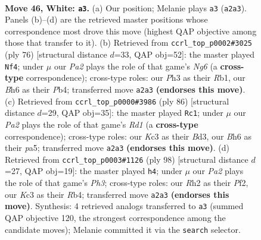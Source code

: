 \documentclass[11pt]{article}
\begin{document}
\clearpage

\begin{figure}[p]\centering
\begin{subfigure}{0.46\textwidth}\centering
\resizebox{\linewidth}{!}{%
\newchessgame
\chessboard[
  setfen={6k1/5p2/5n1B/8/p3p2p/2Kp3P/PP3P1R/1r6 w - - 2 46},
  showmover=false,
  pgfstyle=straightmove, color=movearrow, markmove={a2-a3}
]}
\caption{}
\end{subfigure}\hfill
\begin{subfigure}{0.46\textwidth}\centering
\resizebox{\linewidth}{!}{%
\newchessgame
\chessboard[
  setfen={3k4/3n4/1p1P1pNp/3r4/PP4p1/5pK1/5P2/1R6 w - - 2 39},
  showmover=false,
  pgfstyle=straightmove, color=movearrow, markmove={g6-f4}
]}
\caption{}
\end{subfigure}
\\[4pt]
\begin{subfigure}{0.46\textwidth}\centering
\resizebox{\linewidth}{!}{%
\newchessgame
\chessboard[
  setfen={4r1k1/8/1p1n1p2/pP1P1p1p/5K1P/3B2P1/1P6/3R4 w - - 0 44},
  showmover=false,
  pgfstyle=straightmove, color=movearrow, markmove={d1-c1}
]}
\caption{}
\end{subfigure}\hfill
\begin{subfigure}{0.46\textwidth}\centering
\resizebox{\linewidth}{!}{%
\newchessgame
\chessboard[
  setfen={8/3n3p/Bp3k2/5p2/PR2p3/2r1P2P/5P1K/8 w - - 20 50},
  showmover=false,
  pgfstyle=straightmove, color=movearrow, markmove={h3-h4}
]}
\caption{}
\end{subfigure}
\caption{\textbf{Move 46, White: \texttt{a3}.} (a) Our position; Melanie plays \texttt{a3} (\texttt{a2a3}). Panels (b)--(d) are the retrieved master positions whose correspondence most drove this move (highest QAP objective among those that transfer to it). (b) Retrieved from \texttt{ccrl\_top\_p0002\#3025} (ply 76) [structural distance $d$=33, QAP obj=52]: the master played \texttt{Nf4}; under $\mu$ our \emph{Pa2} plays the role of that game's \emph{Ng6} (a \textbf{cross-type} correspondence); cross-type roles: our \emph{P}h3 as their \emph{R}b1, our \emph{B}h6 as their \emph{P}b4; transferred move \texttt{a2a3} \textbf{(endorses this move)}. (c) Retrieved from \texttt{ccrl\_top\_p0000\#3986} (ply 86) [structural distance $d$=29, QAP obj=35]: the master played \texttt{Rc1}; under $\mu$ our \emph{Pa2} plays the role of that game's \emph{Rd1} (a \textbf{cross-type} correspondence); cross-type roles: our \emph{K}c3 as their \emph{B}d3, our \emph{B}h6 as their \emph{p}a5; transferred move \texttt{a2a3} \textbf{(endorses this move)}. (d) Retrieved from \texttt{ccrl\_top\_p0003\#1126} (ply 98) [structural distance $d$=27, QAP obj=19]: the master played \texttt{h4}; under $\mu$ our \emph{Pa2} plays the role of that game's \emph{Ph3}; cross-type roles: our \emph{R}h2 as their \emph{P}f2, our \emph{K}c3 as their \emph{R}b4; transferred move \texttt{a2a3} \textbf{(endorses this move)}. Synthesis: 4 retrieved analogs transferred to \texttt{a3} (summed QAP objective 120, the strongest correspondence among the candidate moves); Melanie committed it via the \texttt{search} selector.}
\label{fig:thought-m90}
\end{figure}
\end{document}
